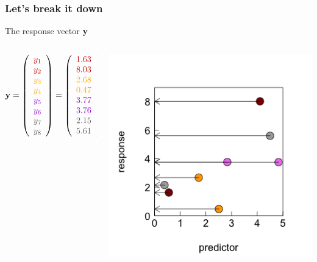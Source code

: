\documentclass{beamer}
\begin{document}
\begin{frame}[fragile]
\frametitle{Let's break it down}
    \large The response vector \textbf{y}
    \begin{columns}
        \begin{column}{0.5\textwidth}        
        \normalsize
            \[
            \mathbf{y} = \left( 
            \begin{array}{c} 
            \color{darkred}{y_1} \\ 
            \color{darkred}{y_2} \\ 
            \color{orange}{y_3} \\ 
            \color{orange}{y_4} \\ 
            \color{violet}{y_5} \\ 
            \color{violet}{y_6} \\ 
            \color{darkgray}{y_7} \\ 
            \color{darkgray}{y_8} 
            \end{array}\right) = \left( 
            \begin{array}{c} 
            \color{darkred}{1.63} \\ 
            \color{darkred}{8.03} \\ 
            \color{orange}{2.68} \\ 
            \color{orange}{0.47} \\ 
            \color{violet}{3.77} \\ 
            \color{violet}{3.76} \\ 
            \color{darkgray}{2.15} \\ 
            \color{darkgray}{5.61} 
            \end{array}\right)
            \]
        \end{column}
        \begin{column}{0.5\textwidth}
            \includegraphics[width=\textwidth]{lectures/day_5_theory_of_mems/figures/unnamed-chunk-3-1.png}

\end{column}
\end{columns}
\end{frame}
\end{document}
